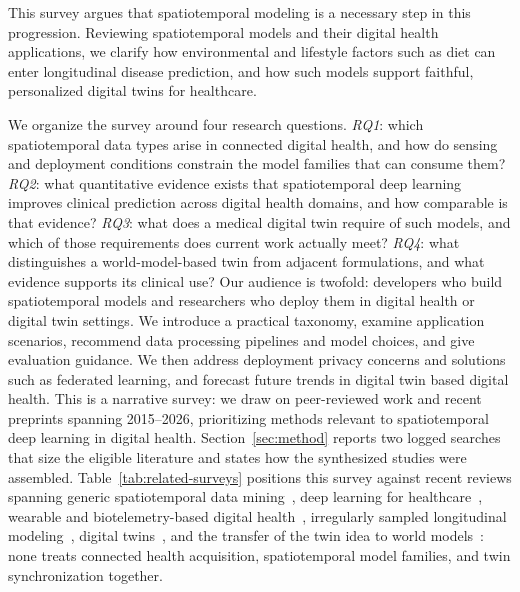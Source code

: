 \documentclass[journal]{IEEEtran}
\begin{document}
This survey argues that spatiotemporal modeling is a necessary step in this progression. Reviewing spatiotemporal models and their digital health applications, we clarify how environmental and lifestyle factors such as diet can enter longitudinal disease prediction, and how such models support faithful, personalized digital twins for healthcare.


We organize the survey around four research questions. \emph{RQ1}: which spatiotemporal data types arise in connected digital health, and how do sensing and deployment conditions constrain the model families that can consume them? \emph{RQ2}: what quantitative evidence exists that spatiotemporal deep learning improves clinical prediction across digital health domains, and how comparable is that evidence? \emph{RQ3}: what does a medical digital twin require of such models, and which of those requirements does current work actually meet? \emph{RQ4}: what distinguishes a world-model-based twin from adjacent formulations, and what evidence supports its clinical use? Our audience is twofold: developers who build spatiotemporal models and researchers who deploy them in digital health or digital twin settings. We introduce a practical taxonomy, examine application scenarios, recommend data processing pipelines and model choices, and give evaluation guidance. We then address deployment privacy concerns and solutions such as federated learning, and forecast future trends in digital twin based digital health. This is a narrative survey: we draw on peer-reviewed work and recent preprints spanning 2015--2026, prioritizing methods relevant to spatiotemporal deep learning in digital health. Section~\ref{sec:method} reports two logged searches that size the eligible literature and states how the synthesized studies were assembled. Table~\ref{tab:related-surveys} positions this survey against recent reviews spanning generic spatiotemporal data mining~\cite{wang2022deep,atluri2018stdm}, deep learning for healthcare~\cite{miotto2018deeplearning}, wearable and biotelemetry-based digital health~\cite{Busnatu2022}, irregularly sampled longitudinal modeling~\cite{shukla2021irregular}, digital twins~\cite{Wang2023Survey,Sel2025VVUQ}, and the transfer of the twin idea to world models~\cite{Zheng2026DTtoWM}: none treats connected health acquisition, spatiotemporal model families, and twin synchronization together.
\end{document}
